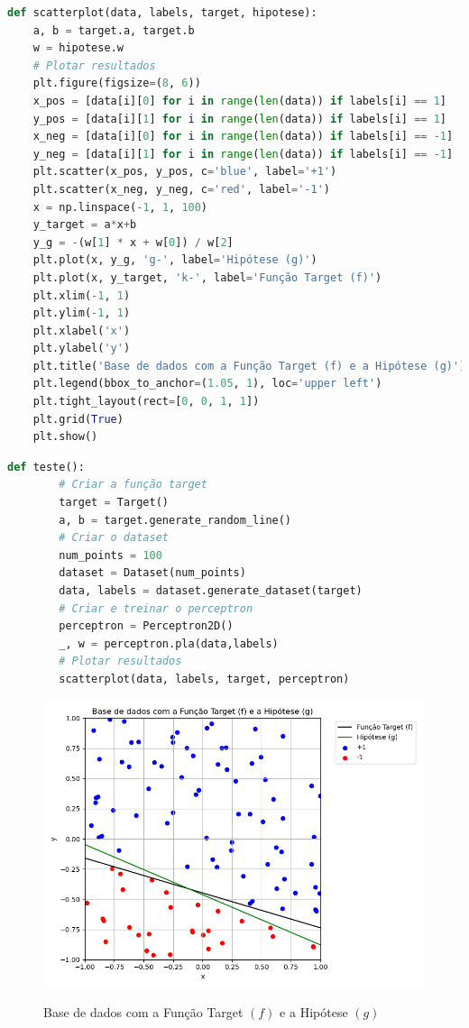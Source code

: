 \begin{lstlisting}[language=Python, caption=Plotagem de dataset com função target (f) e hipótese (g), label=cod:scatterplot]
    def scatterplot(data, labels, target, hipotese):
    a, b = target.a, target.b
    w = hipotese.w
    # Plotar resultados
    plt.figure(figsize=(8, 6))
    x_pos = [data[i][0] for i in range(len(data)) if labels[i] == 1]
    y_pos = [data[i][1] for i in range(len(data)) if labels[i] == 1]
    x_neg = [data[i][0] for i in range(len(data)) if labels[i] == -1]
    y_neg = [data[i][1] for i in range(len(data)) if labels[i] == -1]
    plt.scatter(x_pos, y_pos, c='blue', label='+1')
    plt.scatter(x_neg, y_neg, c='red', label='-1')
    x = np.linspace(-1, 1, 100)
    y_target = a*x+b
    y_g = -(w[1] * x + w[0]) / w[2]
    plt.plot(x, y_g, 'g-', label='Hipótese (g)')
    plt.plot(x, y_target, 'k-', label='Função Target (f)')
    plt.xlim(-1, 1)
    plt.ylim(-1, 1)
    plt.xlabel('x')
    plt.ylabel('y')
    plt.title('Base de dados com a Função Target (f) e a Hipótese (g)')
    plt.legend(bbox_to_anchor=(1.05, 1), loc='upper left')
    plt.tight_layout(rect=[0, 0, 1, 1])
    plt.grid(True)
    plt.show()
\end{lstlisting}

\begin{lstlisting}[language=Python, caption=Teste das classes, label=cod:perceptron_test]
    def teste():
        # Criar a função target
        target = Target()
        a, b = target.generate_random_line()
        # Criar o dataset
        num_points = 100
        dataset = Dataset(num_points)
        data, labels = dataset.generate_dataset(target)
        # Criar e treinar o perceptron
        perceptron = Perceptron2D()
        _, w = perceptron.pla(data,labels)
        # Plotar resultados
        scatterplot(data, labels, target, perceptron)
\end{lstlisting}

\begin{figure}[H]
    \caption{Base de dados com a Função Target $(f)$ e a Hipótese $(g)$}
       \centering
       \includegraphics[width=12cm]{perceptron_plot.png}
    \label{fig:perceptron_plot}
\end{figure}

